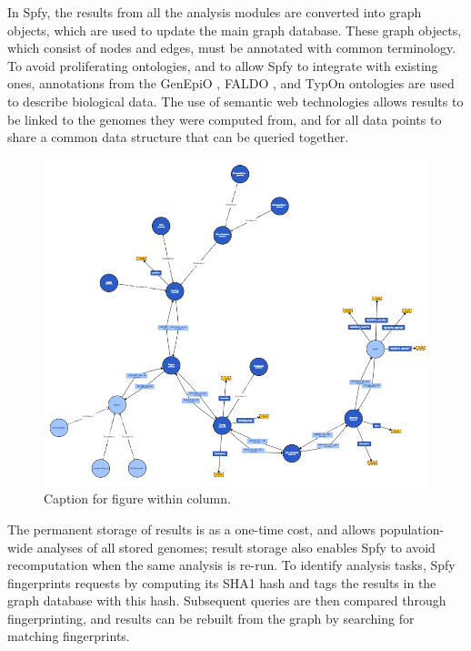 \documentclass{article}
\begin{document}
In Spfy, the results from all the analysis modules are converted into graph objects, which are used to update the main graph database.
These graph objects, which consist of nodes and edges, must be annotated with common terminology.
To avoid proliferating ontologies, and to allow Spfy to integrate with existing ones, annotations from the GenEpiO \cite{griffiths2017context}, FALDO \cite{bolleman2016faldo}, and TypOn \cite{vaz2014typon} ontologies are used to describe biological data.
The use of semantic web technologies allows results to be linked to the genomes they were computed from, and for all data points to share a common data structure that can be queried together.

\begin{figure}[t]
\begin{center}
\includegraphics[width=\textwidth]{images/ontology}
\end{center}
\caption{Caption for figure within column.}
\label{fig-ontology}
\end{figure}

The permanent storage of results is as a one-time cost, and allows population-wide analyses of all stored genomes; result storage also enables Spfy to avoid recomputation when the same analysis is re-run. To identify analysis tasks, Spfy fingerprints requests by computing its SHA1 hash and tags the results in the graph database with this hash. Subsequent queries are then compared through fingerprinting, and results can be rebuilt from the graph by searching for matching fingerprints.
\end{document}

